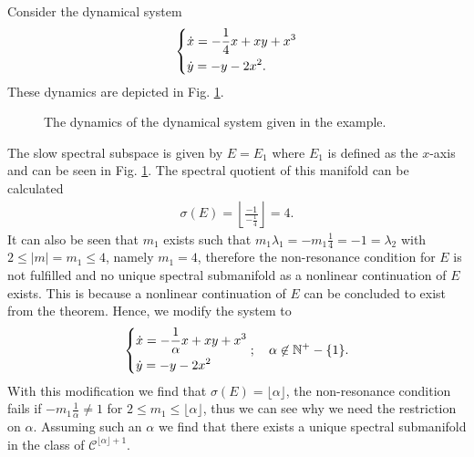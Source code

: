 \begin{ex}[]
	Consider the dynamical system
	\begin{align}
		\begin{dcases}
			\dot{x} = - \frac{1}{4}x + xy + x^{3}\\
			\dot{y} = -y - 2x^2.
		\end{dcases}
	\end{align}
	These dynamics are depicted in Fig. \ref{fig:SSM_ex1}.
	\begin{figure}[h!]
		\centering
		\caption{The dynamics of the dynamical system given in the example.}
		\label{fig:SSM_ex1}
	\end{figure}	
	The slow spectral subspace is given by $E=E_1$ where $E_1$ is defined as the $x$-axis and can be seen in Fig. \ref{fig:SSM_ex1}. The spectral quotient of this manifold can be calculated
	\begin{align}
		\sigma(E) = \left\lfloor \frac{-1}{-\frac{1}{4}} \right\rfloor = 4.
	\end{align}
	It can also be seen that $m_1$ exists such that $m_1\lambda_1 = -m_1 \frac{1}{4} = -1 = \lambda_2 $ with $2 \leq |m| =m_1 \leq 4$, namely $m_1=4$, therefore the non-resonance condition for $E$ is not fulfilled and no unique spectral submanifold as a nonlinear continuation of $E$ exists. This is because a nonlinear continuation of $E$ can be concluded to exist from the theorem.
	Hence, we modify the system to
	\begin{align}
		\begin{dcases}
			\dot{x} = -\frac{1}{\alpha } x + xy + x^{3}\\
			\dot{y} = -y - 2x^2
		\end{dcases};\quad
		\alpha \not \in \mathbb{N}^{+} -\{1\}.
	\end{align}
	With this modification we find that $\sigma(E) = \lfloor \alpha \rfloor$, the non-resonance condition fails if $-m_1 \frac{1}{\alpha } \neq 1$ for $2\leq m_1 \leq \lfloor \alpha \rfloor$, thus we can see why we need the restriction on $\alpha $. Assuming such an $\alpha $ we find that there exists a unique spectral submanifold in the class of $\mathcal{C}^{\lfloor \alpha \rfloor + 1}$.


\end{ex}
